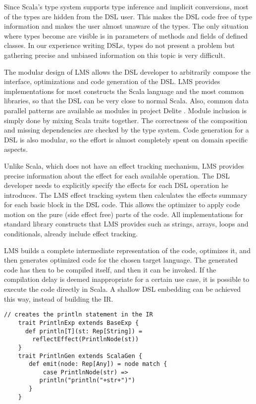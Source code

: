 Since Scala's type system supports type inference and implicit conversions, most of the  types are hidden from the DSL user. This makes the DSL code free of type information and makes the user almost unaware of the  types. The only situation where  types become are visible is in parameters of methods and fields of defined classes. In our experience writing DSLs,  types do not present a problem but gathering precise and unbiased information on this topic is very difficult.  

The modular design of LMS allows the DSL developer to arbitrarily compose the interface, optimizations and code generation of the DSL. LMS provides implementations for most constructs the Scala language and the most common libraries, so that the DSL can be very close to normal Scala. Also, common data parallel patterns are available as modules in project Delite \cite{dsl11}. Module inclusion is simply done by mixing Scala traits together. The correctness of the composition and missing dependencies are checked by the type system. Code generation for a DSL is also modular, so the effort is almost completely spent on domain specific aspects.

Unlike Scala, which does not have an effect tracking mechanism, LMS provides precise information about the effect for each available operation. The DSL developer needs to explicitly specify the effects for each DSL operation he introduces. The LMS effect tracking system then calculates the effects summary for each basic block in the DSL code. This allows the optimizer to apply code motion on the pure (side effect free) parts of the code. All implementations for standard library constructs that LMS provides such as strings, arrays, loops and conditionals, already include effect tracking.

LMS builds a complete intermediate representation of the code, optimizes it, and then generates optimized code for the chosen target language. The generated code has then to be compiled itself, and then it can be invoked. If the compilation delay is deemed inappropriate for a certain use case, it is possible to execute the code directly in Scala. A shallow DSL embedding can be achieved this way, instead of building the IR.

\begin{lstlisting}[name=code, caption=Example of how the DSL module is specified. This module is used for measuring a performance of a block of code and can be reused in any other Scala backed DSL. ,captionpos=b, label=lst:println_dsl, float=t]
    // creates the println statement in the IR
    trait PrintlnExp extends BaseExp {
      def println[T](st: Rep[String]) =
        reflectEffect(PrintlnNode(st)) 
    }
    trait PrintlnGen extends ScalaGen {
       def emit(node: Rep[Any]) = node match {
           case PrintlnNode(str) =>
	      println("println("+str+")")
       }
    }
\end{lstlisting}

